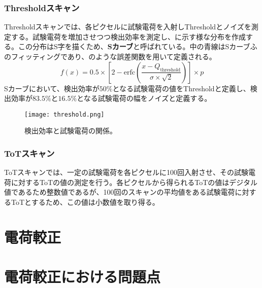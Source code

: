 \subsubsection{Thresholdスキャン}
\label{sec:thresholdscan}
Thresholdスキャンでは、各ピクセルに試験電荷を入射しThresholdとノイズを測定する。試験電荷を増加させつつ検出効率を測定し、に示す様な分布を作成する。この分布はS字を描くため、\textbf{Sカーブ}と呼ばれている。中の青線はSカーブふのフィッティングであり、のような誤差関数を用いて定義される。
\begin{equation}
  \label{eq:gosakannsuu}
  f(x)=0.5\times\left[ 2-\mathrm{erfc}\left( \frac{x-Q_\mathrm{threshold}}{\sigma \times \sqrt{2}} \right)  \right] \times p
\end{equation}
Sカーブにおいて、検出効率が$50\%$となる試験電荷の値をThresholdと定義し、検出効率が$83.5\%$と$16.5\%$となる試験電荷の幅をノイズと定義する。

\begin{figure}[tbp]
  \centering
  \texttt{[image: threshold.png]}
  \caption[検出効率と試験電荷の関係]{検出効率と試験電荷の関係。}
  \label{fig:threshold}
\end{figure}


\subsubsection{ToTスキャン}
\label{sec:totscan}
ToTスキャンでは、一定の試験電荷を各ピクセルに100回入射させ、その試験電荷に対するToTの値の測定を行う。各ピクセルから得られるToTの値はデジタル値であるため整数値であるが、100回のスキャンの平均値をある試験電荷に対するToTとするため、この値は小数値を取り得る。


\section{電荷較正}
\label{sec:calibration}


\section{電荷較正における問題点}
\label{sec:probrem}



\newpage
